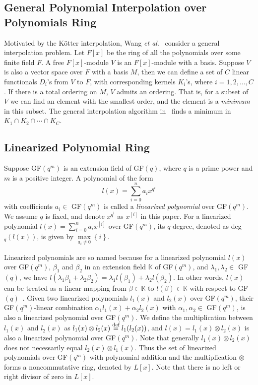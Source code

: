 \documentclass[11pt,onecolumn,draftcls]{IEEEtran}
\newcommand{\df}{\stackrel{\mbox{\scriptsize def}}{=}}
\begin{document}
\subsection{General Polynomial Interpolation over Polynomials Ring}
Motivated by the K\"{o}tter interpolation, Wang \emph{et al}.~\cite{WangMcEliece05} consider a general interpolation problem. Let $F[x]$ be the ring of all the polynomials over some finite field $F$. A free $F[x]$-module $V$ is an $F[x]$-module with a basis. Suppose $V$ is also a vector space over $F$ with a basis $M$, then we can define a set of $C$ linear functionals $D_i$'s from $V$ to $F$, with corresponding kernels $K_i$'s, where $i = 1,2, \ldots, C$. If there is a total ordering on $M$, $V$ admits an ordering. That is, for a subset of $V$ we can find an element with the smallest order, and the element is a \emph{minimum} in this subset. The general interpolation algorithm in~\cite{WangMcEliece05} finds a minimum in $K_1\cap K_2\cap \cdots \cap K_{C}$.




\subsection{Linearized Polynomial Ring} \label{sec: L[x]}
Suppose GF$(q^m)$ is an extension field of GF$(q)$, where $q$ is a prime power and $m$ is a positive integer. A polynomial of the form
\begin{equation}
l(x) = \sum_{i = 0}^n a_ix^{q^i}
\end{equation}
with coefficients $a_i \in$ GF$(q^m)$ is called a \emph{linearized polynomial} over GF$(q^m)$. We assume $q$ is fixed, and denote $x^{q^i}$ as $x^{[i]}$ in this paper. For a linearized polynomial $l(x) = \sum_{i = 0}^n a_ix^{[i]}$ over GF$(q^m)$, its $q$-degree, denoted as deg$_q(l(x))$, is given by $\max\limits_{a_i \ne 0}\left\{i\right\}$.

Linearized polynomials are so named because for a linearized polynomial $l(x)$ over GF$(q^m)$, $\beta_1$ and $\beta_2$ in an extension field $\mathbb{K}$ of GF$(q^m)$, and $\lambda_1,\lambda_2 \in$ GF$(q)$, we have $l(\lambda_1\beta_1 + \lambda_2\beta_2)  = \lambda_1l(\beta_1) + \lambda_2 l(\beta_2)$. In other words, $l(x)$ can be treated as a linear mapping from $\beta \in \mathbb{K}$ to $l(\beta) \in \mathbb{K}$ with respect to GF$(q)$~\cite{lidl_book83}. Given two linearized polynomials $l_1(x)$ and  $l_2(x)$ over GF$(q^m)$, their GF$(q^m)$-linear combination $\alpha_1l_1(x) + \alpha_2l_2(x)$ with $\alpha_1, \alpha_2 \in$ GF$(q^m)$, is also a linearized polynomial over GF$(q^m)$. We define the multiplication between $l_1(x)$ and  $l_2(x)$ as $l_1(x) \otimes l_2(x) \df l_1(l_2(x))$, and $l(x) = l_1(x) \otimes l_2(x)$ is also a linearized polynomial over GF$(q^m)$. Note that generally $l_1(x) \otimes l_2(x)$ does not necessarily equal $ l_2(x) \otimes l_1(x)$. Thus the set of linearized polynomials over GF$(q^m)$ with polynomial addition and the multiplication $\otimes$ forms a noncommutative ring, denoted by $L[x]$. Note that there is no left or right divisor of zero in $L[x]$\cite{ore_ams33}.
\end{document}
